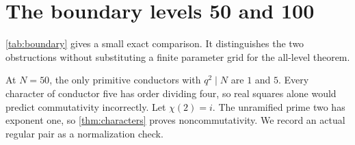 \section{The boundary levels 50 and 100}\label{sec:examples}

\cref{tab:boundary} gives a small exact comparison.
It distinguishes the two obstructions without substituting a
finite parameter grid for the all-level theorem.
\BoundaryTable

At \(N=50\), the only primitive conductors with \(q^2\mid N\)
are \(1\) and \(5\). Every character of conductor five has
order dividing four, so real squares alone would predict
commutativity incorrectly. Let \(\chi(2)=i\).
The unramified prime two has exponent one, so
\cref{thm:characters} proves noncommutativity. We record an
actual regular pair as a normalization check.

